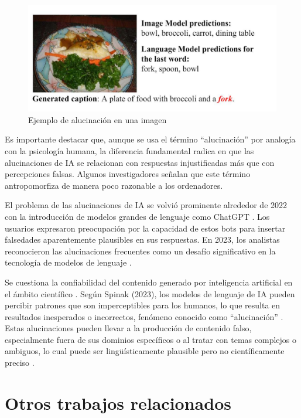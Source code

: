\begin{figure}[h]
	\centering
	\includegraphics[scale=0.6]{Imagenes/alucinacionImagenes}
	\caption{Ejemplo de alucinación en una imagen \cite{rohrbach2023object}}
	\label{img:alucinacion2}
\end{figure}
Es importante destacar que, aunque se usa el término ``alucinación'' por analogía con la psicología humana, la diferencia fundamental radica en que las alucinaciones de IA se relacionan con respuestas injustificadas más que con percepciones falsas. Algunos investigadores señalan que este término antropomorfiza de manera poco razonable a los ordenadores.

El problema de las alucinaciones de IA se volvió prominente alrededor de 2022 con la introducción de modelos grandes de lenguaje como ChatGPT \citep{zhuo2023exploring}. Los usuarios expresaron preocupación por la capacidad de estos bots para insertar falsedades aparentemente plausibles en sus respuestas. En 2023, los analistas reconocieron las alucinaciones frecuentes como un desafío significativo en la tecnología de modelos de lenguaje \citep{leswing2023microsoft}.

Se cuestiona la confiabilidad del contenido generado por inteligencia artificial en el ámbito científico \citep{machinmastromatteo2023implicaciones}. Según Spinak (2023), los modelos de lenguaje de IA pueden percibir patrones que son imperceptibles para los humanos, lo que resulta en resultados inesperados o incorrectos, fenómeno conocido como ``alucinación'' \citep{spinak2023alucinaciones}. Estas alucinaciones pueden llevar a la producción de contenido falso, especialmente fuera de sus dominios específicos o al tratar con temas complejos o ambiguos, lo cual puede ser lingüísticamente plausible pero no científicamente preciso \citep{sage2023chatgpt}.

\section{Otros trabajos relacionados}
